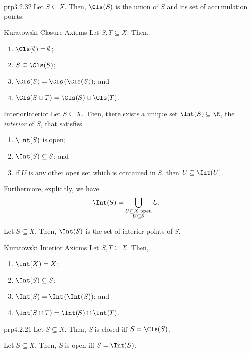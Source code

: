 \begin{prp}{}{prp3.2.32}
Let $S\subseteq X$.  Then, $\Cls (S)$ is the union of $S$ and its set of accumulation points.
\end{prp}
\begin{thm}{Kuratowski Closure Axioms}{}
Let $S,T\subseteq X$.  Then,
\begin{enumerate}
\item $\Cls (\emptyset) =\emptyset$;
\item $S\subseteq \Cls (S)$;
\item $\Cls (S)=\Cls \left( \Cls (S)\right)$; and
\item $\Cls (S\cup T)=\Cls (S)\cup \Cls (T)$.
\end{enumerate}
\end{thm}
\begin{prp}{Interior}{Interior}
Let $S\subseteq X$.  Then, there exists a unique set $\Int (S)\subseteq \R$, the \emph{interior} of $S$, that satisfies
\begin{enumerate}
\item $\Int (S)$ is open;
\item $\Int (S)\subseteq S$; and
\item if $U$ is any other open set which is contained in $S$, then $U\subseteq \Int (U)$.
\end{enumerate}
Furthermore, explicitly, we have
\begin{equation}
\Int (S)=\bigcup _{\substack{U\subseteq X\text{ open} \\ U\subseteq S}}U.
\end{equation}
\end{prp}
\begin{prp}{}{}
Let $S\subseteq X$.  Then, $\Int (S)$ is the set of interior points of $S$.
\end{prp}
\begin{thm}{Kuratowski Interior Axioms}{}
Let $S,T\subseteq X$.  Then,
\begin{enumerate}
\item $\Int (X)=X$;
\item $\Int (S)\subseteq S$;
\item $\Int (S)=\Int \left( \Int (S)\right)$; and
\item $\Int (S\cap T)=\Int (S)\cap \Int (T)$.
\end{enumerate}
\end{thm}
\begin{prp}{}{prp4.2.21}
Let $S\subseteq X$.  Then, $S$ is closed iff $S=\Cls (S)$.
\end{prp}
\begin{prp}{}{}
Let $S\subseteq X$.  Then, $S$ is open iff $S=\Int (S)$.
\end{prp}

